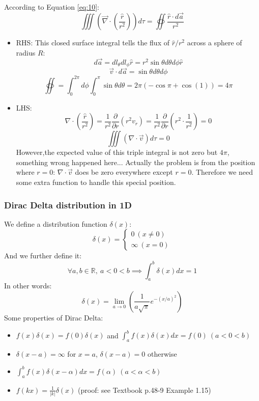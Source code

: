 \documentclass[12pt,a4paper,twoside]{article}
\numberwithin{equation}{section}
\begin{document}
	\noindent According to Equation \ref{eq:10}:
	\[\iiint (\overrightarrow{\nabla}\cdot (\frac{\hat{r}}{r^2}))d\tau=\oiint \frac{\hat{r}\cdot d\overrightarrow{a}}{r^2}\]
	
    \begin{itemize}
	    \item RHS: This closed surface integral tells the flux of \(\hat{r}/r^2\) across a sphere of radius $R$:
	    \[d\overrightarrow{a}=dl_\theta dl_\phi \hat{r}=r^2\sin\theta d\theta d\phi \hat{r}\]
	    \[\overrightarrow{v}\cdot d\overrightarrow{a}=\sin\theta d\theta d\phi\]
	    \[\oiint = \int_0^{2\pi}d\phi\int_0^{\pi}\sin\theta d\theta =2\pi(-\cos\pi+\cos (1))=4\pi\]
	    
	    \item LHS:
	    \[\nabla \cdot (\frac{\hat{r}}{r^2})=\frac{1}{r^2}\frac{\partial}{\partial r}(r^2v_r)=\frac{1}{r^2}\frac{\partial}{\partial r}(r^2\cdot\frac{1}{r^2})=0\]
	    \[\iiint (\nabla\cdot \overrightarrow{v})d\tau = 0\]
	    However,the expected value of this triple integral is not zero but $4\pi$, something wrong happened here... Actually the problem is from the position where $r=0$: $\nabla\cdot\overrightarrow{v}$ does be zero everywhere except $r=0$. Therefore we need some extra function to handle this special position.
	\end{itemize}
	
	\subsubsection{Dirac Delta distribution in 1D}
	We define a distribution function $\delta(x)$:
	\begin{equation}
	    \delta(x)=\left\{\begin{matrix}
        0\ (x\neq 0)\\ 
        \infty\ (x=0)
    \end{matrix}\right.
	\end{equation}
	And we further define it:
	\[\forall a,b\in \mathbb{R},\ a<0<b\implies  \int_{a}^{b}\delta(x)dx=1\]
	In other words:
	\[\delta(x)=\lim_{a\to 0}\left(\frac{1}{a\sqrt{\pi}}e^{-(x/a)^2}\right)\]
	Some properties of Dirac Delta:
	\begin{itemize}
	    \item \(f(x)\delta(x)=f(0)\delta(x)\) and \(\int_a^bf(x)\delta(x)dx=f(0)\ (a<0<b)\)
	    \item \(\delta(x-a)=\infty\) for $x=a$, \(\delta(x-a)=0\) otherwise
	    \item \(\int_a^bf(x)\delta(x-\alpha)dx=f(\alpha)\ (a<\alpha<b)\)
	    \item \(f(kx)=\frac{1}{|k|}\delta(x)\) (proof: see Textbook p.48-9 Example 1.15)
	\end{itemize}
	
\end{document}
